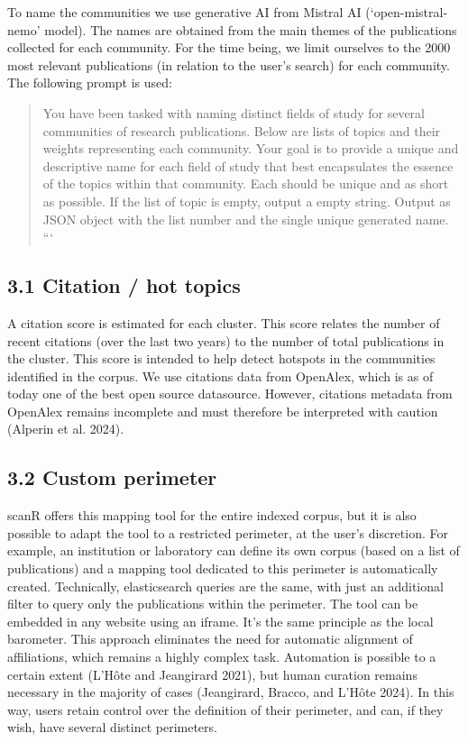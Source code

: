 \documentclass[
]{article}
\begin{document}
To name the communities we use generative AI from Mistral AI
(`open-mistral-nemo' model). The names are obtained from the main themes
of the publications collected for each community. For the time being, we
limit ourselves to the 2000 most relevant publications (in relation to
the user's search) for each community. The following prompt is used:

\begin{quote}
You have been tasked with naming distinct fields of study for several
communities of research publications. Below are lists of topics and
their weights representing each community. Your goal is to provide a
unique and descriptive name for each field of study that best
encapsulates the essence of the topics within that community. Each
should be unique and as short as possible. If the list of topic is
empty, output a empty string. Output as JSON object with the list number
and the single unique generated name. ```
\end{quote}

\hypertarget{citation-hot-topics}{%
\subsection{3.1 Citation / hot topics}\label{citation-hot-topics}}

A citation score is estimated for each cluster. This score relates the
number of recent citations (over the last two years) to the number of
total publications in the cluster. This score is intended to help detect
hotspots in the communities identified in the corpus. We use citations
data from OpenAlex, which is as of today one of the best open source
datasource. However, citations metadata from OpenAlex remains incomplete
and must therefore be interpreted with caution (Alperin et al. 2024).

\hypertarget{custom-perimeter}{%
\subsection{3.2 Custom perimeter}\label{custom-perimeter}}

scanR offers this mapping tool for the entire indexed corpus, but it is
also possible to adapt the tool to a restricted perimeter, at the user's
discretion. For example, an institution or laboratory can define its own
corpus (based on a list of publications) and a mapping tool dedicated to
this perimeter is automatically created. Technically, elasticsearch
queries are the same, with just an additional filter to query only the
publications within the perimeter. The tool can be embedded in any
website using an iframe. It's the same principle as the local barometer.
This approach eliminates the need for automatic alignment of
affiliations, which remains a highly complex task. Automation is
possible to a certain extent (L'Hôte and Jeangirard 2021), but human
curation remains necessary in the majority of cases (Jeangirard, Bracco,
and L'Hôte 2024). In this way, users retain control over the definition
of their perimeter, and can, if they wish, have several distinct
perimeters.
\end{document}
